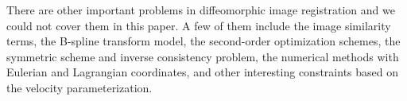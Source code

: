\documentclass[letterpaper,12pt]{article}
\begin{document}
There are other important problems in diffeomorphic image registration and we could not cover them in this paper. A few of them include the image  similarity terms, the B-spline transform model, the second-order optimization schemes, the symmetric scheme and inverse consistency problem, the numerical methods with Eulerian and Lagrangian coordinates, and other interesting constraints based on the velocity parameterization. 


% 
% 
% 
% 
% 










\end{document}
